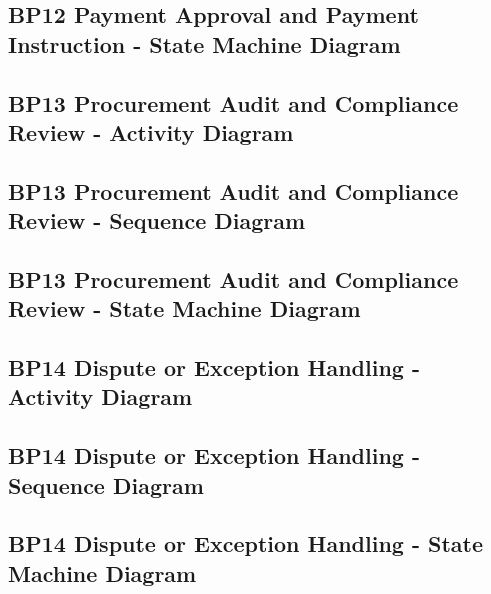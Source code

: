 \documentclass[conference]{IEEEtran}
\begin{document}
\subsection*{BP12 Payment Approval and Payment Instruction - State Machine Diagram}



\subsection*{BP13 Procurement Audit and Compliance Review - Activity Diagram}



\subsection*{BP13 Procurement Audit and Compliance Review - Sequence Diagram}



\subsection*{BP13 Procurement Audit and Compliance Review - State Machine Diagram}



\subsection*{BP14 Dispute or Exception Handling - Activity Diagram}



\subsection*{BP14 Dispute or Exception Handling - Sequence Diagram}



\subsection*{BP14 Dispute or Exception Handling - State Machine Diagram}

\end{document}
